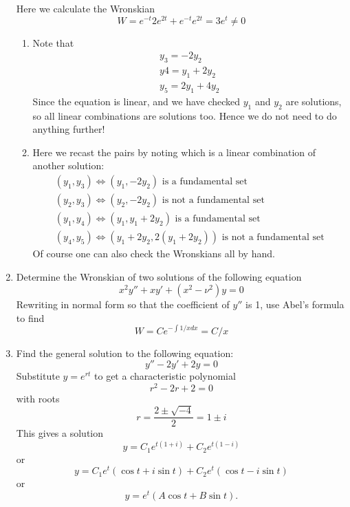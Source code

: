 \documentclass[10pt,a4paper]{letter}
\begin{document}
\begin{enumerate}
Here we calculate the Wronskian 
\[ W = e^{-t} 2e^{2t} + e^{-t}e^{2t} = 3 e^t \neq 0 \]
\begin{enumerate}
\item Note that 
\begin{align*}
y_3 = -2y_2 \\
y4 = y_1 + 2 y_2 \\
y_5 = 2y_1 + 4 y_2
\end{align*}
Since the equation is linear, and we have checked $y_1$ and $y_2$ are solutions, so all linear combinations are solutions too. Hence we do not need to do anything further!
\item Here we recast the pairs by noting which is a linear combination of another solution:
\begin{align*}
(y_1,y_3) \Leftrightarrow (y_1,-2y_2) \text{ is a fundamental set} \\
(y_2,y_3) \Leftrightarrow (y_2,-2y_2) \text{ is not a fundamental set} \\
(y_1,y_4) \Leftrightarrow (y_1,y_1+2y_2) \text{ is a fundamental set} \\
(y_4,y_5) \Leftrightarrow (y_1+2y_2,2(y_1+2y_2)) \text{ is not a fundamental set}
\end{align*}
Of course one can also check the Wronskians all by hand.
\end{enumerate}
\item Determine the Wronskian of two solutions of the following equation 
\[ x^2 y'' + xy' + (x^2 - \nu^2)y = 0 \]
Rewriting in normal form so that the coefficient of $y''$ is 1, use Abel's formula to find
\[ W = Ce^{-\int 1/x dx} = C/x \]
\item Find the general solution to the following equation:
\[ y'' - 2y' + 2y = 0 \]
Substitute $y = e^{rt}$ to get a characteristic polynomial
\[ r^2 - 2r + 2 = 0 \]
with roots
\[ r = \frac{2 \pm \sqrt{-4}}{2} = 1 \pm i \]
This gives a solution
\[ y = C_1 e^{t(1+i)} + C_2 e^{t(1-i)} \]
or
\[ y = C_1 e^t (\cos t + i \sin t) + C_2 e^t ( \cos t - i \sin t) \]
or
\[ y = e^t(A \cos t + B \sin t). \]
\end{enumerate}
\end{document}
